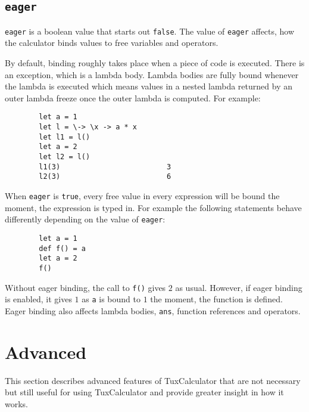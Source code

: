 \documentclass[10pt]{article}
\begin{document}
    \subsection{\texttt{eager}}\label{subsec:eager}
    \verb|eager| is a boolean value that starts out \verb|false|.
    The value of \verb|eager| affects, how the calculator binds values to free variables and operators.
    
    By default, binding roughly takes place when a piece of code is executed.
    There is an exception, which is a lambda body.
    Lambda bodies are fully bound whenever the lambda is executed which means values in a nested lambda returned by an outer lambda freeze once the outer lambda is computed.
    For example:
    \begin{verbatim}
        let a = 1
        let l = \-> \x -> a * x
        let l1 = l()
        let a = 2
        let l2 = l()
        l1(3)                         3
        l2(3)                         6
    \end{verbatim}
    When \verb|eager| is \verb|true|, every free value in every expression will be bound the moment, the expression is typed in.
    For example the following statements behave differently depending on the value of \verb|eager|:
    \begin{verbatim}
        let a = 1
        def f() = a
        let a = 2
        f()
    \end{verbatim}
    Without eager binding, the call to \verb|f()| gives $ 2 $ as usual.
    However, if eager binding is enabled, it gives $ 1 $ as \verb|a| is bound to $ 1 $ the moment, the function is defined.
    Eager binding also affects lambda bodies, \verb|ans|, function references and operators.
    
    \section{Advanced}\label{sec:advanced}
    This section describes advanced features of TuxCalculator that are not necessary but still useful for using TuxCalculator and provide greater insight in how it works.
    
\end{document}
